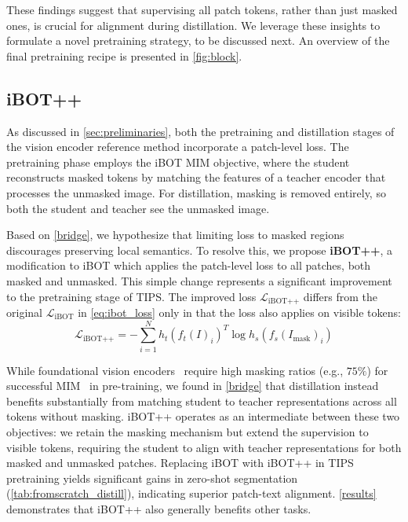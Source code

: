 These findings suggest that supervising all patch tokens, rather than just masked ones, is crucial for alignment during distillation. We leverage these insights to formulate a novel pretraining strategy, to be discussed next.
An overview of the final \tipsvtwo pretraining recipe is presented in \cref{fig:block}.


\subsection{iBOT++}
\label{loss_diff}

As discussed in \cref{sec:preliminaries}, both the pretraining and distillation stages of the vision encoder reference method incorporate a patch-level loss.
The pretraining phase employs the iBOT \citep{zhou2022ibot} MIM objective, where the student reconstructs masked tokens by matching the features of a teacher encoder that processes the unmasked image.
For distillation, masking is removed entirely, so both the student and teacher see the unmasked image.


Based on \cref{bridge}, we hypothesize that limiting loss to masked regions discourages preserving local semantics. To resolve this, we propose \textbf{iBOT++}, a modification to iBOT which applies the patch-level loss to all patches, both masked and unmasked.
This simple change represents a significant improvement to the pretraining stage of TIPS.
The improved loss $\mathcal{L}_\text{iBOT++}$  differs from the original $\mathcal{L}_\text{iBOT}$ in \cref{eq:ibot_loss} only in that the loss also applies on visible tokens: 
\begin{equation}
    \label{eq:ibot_plus_loss}
        \mathcal{L}_\text{iBOT++} = - \sum_{i=1}^N   h_t(f_t(I)_i)^T \log h_s(f_s(I_\text{mask})_i)
\end{equation}


While foundational vision encoders~\citep{tips_paper, oquab2024dinov2, siméoni2025dinov3} require high masking ratios (e.g., $75\%$) for successful MIM~\citep{he2022mae} in pre-training, we found in \cref{bridge} that distillation instead benefits substantially from matching student to teacher representations across all tokens without masking. 
iBOT++ operates as an intermediate between these two objectives: we retain the masking mechanism but extend the supervision to visible tokens, requiring the student to align with teacher representations for both masked and unmasked patches. 
Replacing iBOT with iBOT++ in TIPS pretraining yields significant gains in zero-shot segmentation (\cref{tab:fromscratch_distill}), indicating superior patch-text alignment. 
\cref{results} demonstrates that iBOT++ also generally benefits other tasks.

